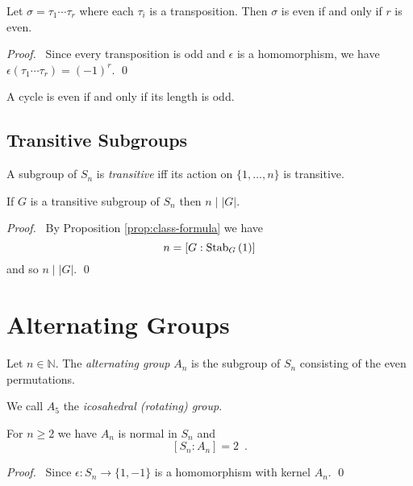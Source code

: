 \begin{prop}
Let $\sigma = \tau_1 \cdots \tau_r$ where each $\tau_i$ is a transposition. Then $\sigma$ is even if and only if $r$ is even.
\end{prop}

\begin{proof}
\pf\ Since every transposition is odd and $\epsilon$ is a homomorphism, we have $\epsilon(\tau_1 \cdots \tau_r) = (-1)^r$. \qed
\end{proof}

\begin{cor}
A cycle is even if and only if its length is odd.
\end{cor}

\subsection{Transitive Subgroups}

\begin{df}[Transitive]
A subgroup of $S_n$ is \emph{transitive} iff its action on $\{1, \ldots, n\}$ is transitive.
\end{df}

\begin{prop}
If $G$ is a transitive subgroup of $S_n$ then $n \mid |G|$.
\end{prop}

\begin{proof}
\pf\ By Proposition \ref{prop:class-formula} we have
\[ n = [G : \mathrm{Stab}_{G} \left( {1} \right)] \]
and so $n \mid |G|$. \qed
\end{proof}

\section{Alternating Groups}

\begin{df}
Let $n \in \mathbb{N}$. The \emph{alternating group} $A_n$ is the subgroup of $S_n$ consisting of the even permutations.

We call $A_5$ the \emph{icosahedral (rotating) group}.
\end{df}

\begin{prop}
For $n \geq 2$ we have
$A_n$ is normal in $S_n$ and
\[ [S_n : A_n] = 2 \enspace . \]
\end{prop}

\begin{proof}
\pf\ Since $\epsilon : S_n \rightarrow \{ 1, -1 \}$ is a homomorphism with kernel $A_n$. \qed
\end{proof}

